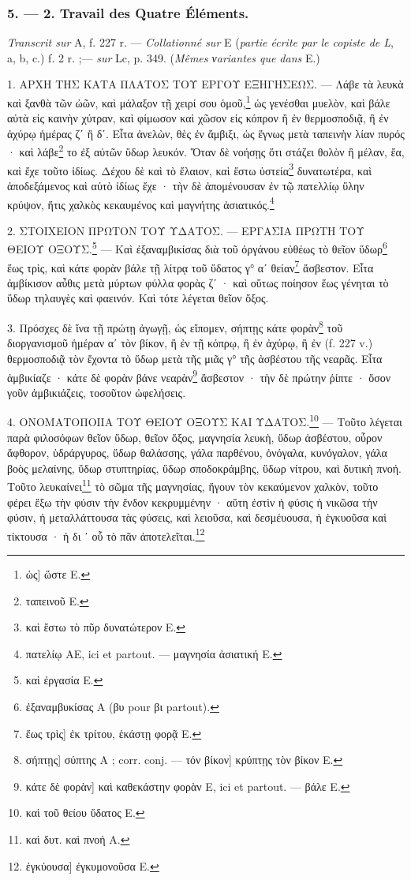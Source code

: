 \documentclass[a4paper, 11pt, oneside, polutonikogreek, french]{article}
\begin{document}
\bigskip
\centerline{\EightStarTaper}
\centerline{\EightStarTaper\EightStarTaper}
\bigskip

\subsubsection{5. --- 2. Travail des Quatre Éléments.}

\emph{Transcrit sur} A, f. 227 r. --- \emph{Collationné sur} E (\emph{partie écrite par le copiste de L}, a, b, c.) f. 2 r. ;--- \emph{sur} Lc, p. 349. (\emph{Mêmes νariantes que dans} E.)

\bigskip

1. ΑΡΧΗ ΤΗΣ ΚΑΤΑ ΠΛΑΤΟΣ ΤΟΥ ΕΡΓΟΥ ΕΞΗΓΗΣΕΩΣ. --- Λάβε τὰ λευκὰ καὶ ξανθὰ τῶν ὠῶν, καὶ μάλαξον τῇ χειρί σου ὁμοῦ,\footnote{ὡς] ὥστε E.} ὡς γενέσθαι μυελὸν, καὶ βάλε αὐτὰ εἰς καινὴν χύτραν, καὶ φίμωσον καὶ χῶσον εἰς κόπρον ἢ ἐν θερμοσποδιᾷ, ἢ ἐν ἀχύρῳ ἡμέρας ζʹ ἢ δʹ. Εἶτα ἀνελὼν, θὲς ἐν ἄμβιξι, ὡς ἔγνως μετὰ ταπεινὴν λίαν πυρός · καὶ λάβε\footnote{ταπεινοῦ E.} το ἐξ αὐτῶν ὕδωρ λευκόν. Ὅταν δὲ νοήσῃς ὅτι στάζει θολὸν ἢ μέλαν, ἔα, καὶ ἔχε τοῦτο ἰδίως. Δέχου δὲ καὶ τὸ ἔλαιον, καὶ ἔστω ὑστεία\footnote{καὶ ἔστω τὸ πῦρ δυνατώτερον E.} δυνατωτέρα, καὶ ἀποδεξάμενος καὶ αὐτὸ ἰδίως ἔχε · τὴν δὲ ἀπομένουσαν ἐν τῷ πατελλίῳ ὕλην κρύψον, ἥτις χαλκὸς κεκαυμένος καὶ μαγνήτης ἀσιατικός.\footnote{πατελίῳ AE, ici et partout. --- μαγνησία ἀσιατική E.}

2. ΣΤΟΙΧΕΙΟΝ ΠΡΩΤΟΝ ΤΟΥ ΥΔΑΤΟΣ. --- ΕΡΓΑΣΙΑ ΠΡΩΤΗ ΤΟΥ ΘΕΙΟΥ ΟΞΟΥΣ.\footnote{καὶ ἐργασία E.} --- Καὶ ἐξαναμβικίσας διὰ τοῦ ὀργάνου εὐθέως τὸ θεῖον ὕδωρ\footnote{ἐξαναμβυκίσας A (βυ pour βι partout).} ἕως τρὶς, καὶ κάτε φορὰν βάλε τῇ λίτρᾳ τοῦ ὕδατος γ° αʹ θείαν\footnote{ἕως τρὶς] ἐκ τρίτου, ἑκάστῃ φορᾷ E.} ἄσβεστον. Εἶτα ἀμβίκισον αὖθις μετὰ μύρτων φύλλα φορὰς ζʹ · καὶ οὕτως ποίησον ἕως γένηται τὸ ὕδωρ τηλαυγὲς καὶ φαεινόν. Καὶ τότε λέγεται θεῖον ὄξος.

3. Πρόσχες δὲ ἵνα τῇ πρώτῃ ἀγωγῇ, ὡς εἴπομεν, σήπτῃς κάτε φορὰν\footnote{σήπτῃς] σύπτης A ; corr. conj. --- τόν βίκον] κρύπτῃς τὸν βίκον E.} τοῦ διοργανισμοῦ ἡμέραν αʹ τὸν βίκον, ἢ ἐν τῇ κόπρῳ, ἢ ἐν ἀχύρῳ, ἢ ἐν (f. 227 v.) θερμοσποδιᾷ τὸν ἔχοντα τὸ ὕδωρ μετὰ τῆς μιᾶς γ° τῆς ἀσβέστου τῆς νεαρᾶς. Εἶτα ἀμβικίαζε · κάτε δὲ φορὰν βάνε νεαρὰν\footnote{κάτε δὲ φορὰν] καὶ καθεκάστην φορὰν E, ici et partout. --- βάλε E.} ἄσβεστον · τὴν δὲ πρώτην ῥίπτε · ὅσον γοῦν ἀμβικιάζεις, τοσοῦτον ὠφελήσεις.

4. ΟΝΟΜΑΤΟΠΟΙΙΑ ΤΟΥ ΘΕΙΟΥ ΟΞΟΥΣ ΚΑΙ ΥΔΑΤΟΣ.\footnote{καὶ τοῦ θείου ὕδατος E.} --- Τοῦτο λέγεται παρὰ φιλοσόφων θεῖον ὕδωρ, θεῖον ὄξος, μαγνησία λευκὴ, ὕδωρ ἀσβέστου, οὖρον ἄφθορον, ὑδράργυρος, ὕδωρ θαλάσσης, γάλα παρθένου, ὀνόγαλα, κυνόγαλον, γάλα βοὸς μελαίνης, ὕδωρ στυπτηρίας, ὕδωρ σποδοκράμβης, ὕδωρ νίτρου, καὶ δυτικὴ πνοή. Τοῦτο λευκαίνει\footnote{καὶ δυτ. καὶ πνοή A.} τὸ σῶμα τῆς μαγνησίας, ἤγουν τὸν κεκαύμενον χαλκὸν, τοῦτο φέρει ἔξω τὴν φύσιν τὴν ἔνδον κεκρυμμένην · αὕτη ἐστὶν ἡ φύσις ἡ νικῶσα τὴν φύσιν, ἡ μεταλλάττουσα τὰς φύσεις, καὶ λειοῦσα, καὶ δεσμέυουσα, ἡ ἑγκυοῦσα καὶ τίκτουσα · ἡ δι ᾽ οὗ τὸ πᾶν ἀποτελεῖται.\footnote{ἐγκύουσα] ἐγκυμονοῦσα E.}
\end{document}
